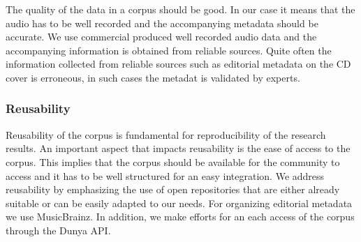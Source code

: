 The quality of the data in a corpus should be good. In our case it means that the audio has to be well recorded and the accompanying metadata should be accurate. We use commercial produced well recorded audio data and the accompanying information is obtained from reliable sources. Quite often the information collected from reliable sources such as editorial metadata on the CD cover is erroneous, in such cases the metadat is validated by experts. 


\subsubsection{Reusability}

Reusability of the corpus is fundamental for reproducibility of the research results. An important aspect that impacts reusability is the ease of access to the corpus. This implies that the corpus should be available for the community to access and it has to be well structured for an easy integration. We address reusability by emphasizing the use of open repositories that are either already suitable or can be easily adapted to our needs. For organizing editorial metadata we use MusicBrainz. In addition, we make efforts for an each access of the corpus through the Dunya API.







